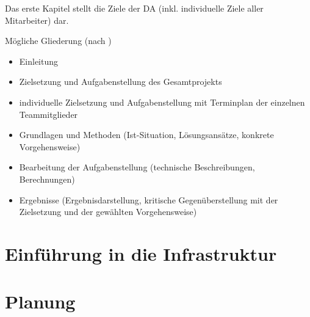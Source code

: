 \documentclass[
    headings=optiontotocandhead,%
    twoside,
    numbers=noenddot,%
    toc=flat, %
    12pt, %
    titlepage, %
    parskip=full, %
    listof=totoc, %
    listof=flat, %
    numbers=noenddot, %
    bibliography=totoc, %
    a4paper,DIV=14,
    BCOR=15mm,
]{scrbook}
\begin{document}

Das erste Kapitel stellt die Ziele der DA (inkl. individuelle Ziele
aller Mitarbeiter) dar.

Mögliche Gliederung (nach \cite{leitfaden})

\begin{itemize}
\item  Einleitung
\item   Zielsetzung und Aufgabenstellung des Gesamtprojekts
\item   individuelle Zielsetzung und Aufgabenstellung mit Terminplan der einzelnen Teammitglieder
\item   Grundlagen und Methoden (Ist-Situation, Lösungsansätze, konkrete Vorgehensweise)
\item   Bearbeitung der Aufgabenstellung (technische Beschreibungen, Berechnungen)
\item   Ergebnisse (Ergebnisdarstellung, kritische Gegenüberstellung mit der Zielsetzung
 und der gewählten Vorgehensweise)
\end{itemize}




%

\renewcommand{\kapitelautor}{Autor: Josip Domazet}



\renewcommand{\kapitelautor}{Autor: Mathias Möller}



\chapter{Einführung in die Infrastruktur}
\renewcommand{\kapitelautor}{Autor: Hannes Weiss}




\renewcommand{\kapitelautor}{}

\chapter{Planung}
\end{document}
